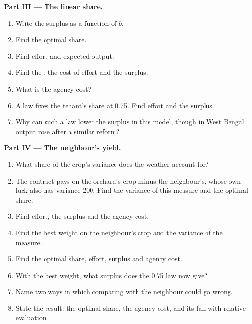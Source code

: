 \begin{problem}
\medskip
\noindent\textbf{Part III --- The linear share.}
\begin{enumerate}[resume]
  \item Write the surplus as a function of $b$.
  \item Find the optimal share.
  \item Find effort and expected output.
  \item Find the , the cost of effort and the surplus.
  \item What is the agency cost?
  \item A law fixes the tenant's share at 0.75. Find effort and the surplus.
  \item Why can such a law lower the surplus in this model, though in West Bengal output rose after a similar reform?
\end{enumerate}

\medskip
\noindent\textbf{Part IV --- The neighbour's yield.}
\begin{enumerate}[resume]
  \item What share of the crop's variance does the weather account for?
  \item The contract pays on the orchard's crop minus the neighbour's, whose own luck also has variance 200. Find the variance
    of this measure and the optimal share.
  \item Find effort, the surplus and the agency cost.
  \item Find the best weight on the neighbour's crop and the variance of the measure.
  \item Find the optimal share, effort, surplus and agency cost.
  \item With the best weight, what surplus does the 0.75 law now give?
  \item Name two ways in which comparing with the neighbour could go wrong.
  \item State the result: the optimal share, the agency cost, and its fall with relative evaluation.
\end{enumerate}
\end{problem}
